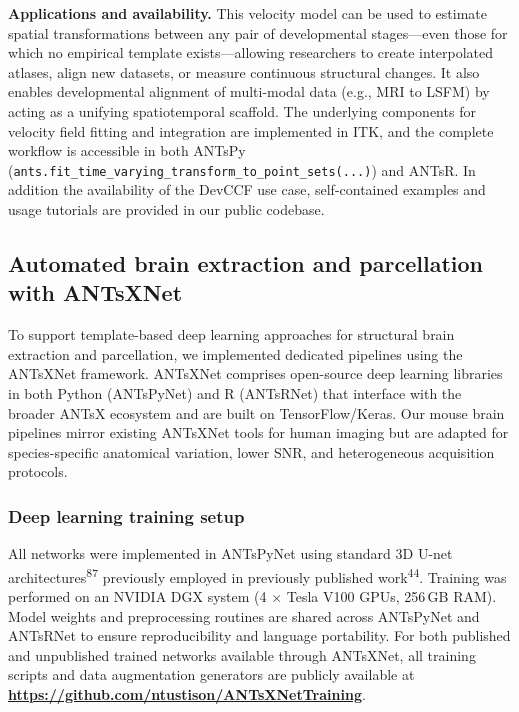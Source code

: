 \documentclass[
  12pt,
]{article}
\begin{document}
\textbf{Applications and availability.} This velocity model can be used
to estimate spatial transformations between any pair of developmental
stages---even those for which no empirical template exists---allowing
researchers to create interpolated atlases, align new datasets, or
measure continuous structural changes. It also enables developmental
alignment of multi-modal data (e.g., MRI to LSFM) by acting as a
unifying spatiotemporal scaffold. The underlying components for velocity
field fitting and integration are implemented in ITK, and the complete
workflow is accessible in both ANTsPy
(\texttt{ants.fit\_time\_varying\_transform\_to\_point\_sets(...)}) and
ANTsR. In addition the availability of the DevCCF use case,
self-contained examples and usage tutorials are provided in our public
codebase.

\subsection{Automated brain extraction and parcellation with
ANTsXNet}\label{automated-brain-extraction-and-parcellation-with-antsxnet}

To support template-based deep learning approaches for structural brain
extraction and parcellation, we implemented dedicated pipelines using
the ANTsXNet framework. ANTsXNet comprises open-source deep learning
libraries in both Python (ANTsPyNet) and R (ANTsRNet) that interface
with the broader ANTsX ecosystem and are built on TensorFlow/Keras. Our
mouse brain pipelines mirror existing ANTsXNet tools for human imaging
but are adapted for species-specific anatomical variation, lower SNR,
and heterogeneous acquisition protocols.

\subsubsection{Deep learning training
setup}\label{deep-learning-training-setup}

All networks were implemented in ANTsPyNet using standard 3D U-net
architectures\textsuperscript{87} previously employed in previously
published work\textsuperscript{44}. Training was performed on an NVIDIA
DGX system (4 \(\times\) Tesla V100 GPUs, 256\,GB RAM). Model weights
and preprocessing routines are shared across ANTsPyNet and ANTsRNet to
ensure reproducibility and language portability. For both published and
unpublished trained networks available through ANTsXNet, all training
scripts and data augmentation generators are publicly available at
\textbf{\url{https://github.com/ntustison/ANTsXNetTraining}}.
\end{document}
